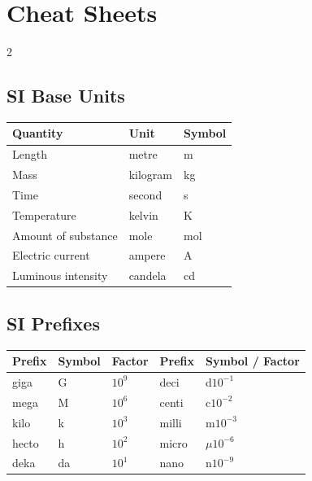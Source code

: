 \section{Cheat Sheets}
\begin{multicols}{2}
\footnotesize
\setlength{\tabcolsep}{3pt}
\renewcommand{\arraystretch}{1.1}

\subsection*{SI Base Units}
\begin{tabular}{@{}p{3.4cm}p{2.2cm}p{1.4cm}@{}}
\toprule
Quantity & Unit & Symbol\\ \midrule
Length & metre & m\\
Mass & kilogram & kg\\
Time & second & s\\
Temperature & kelvin & K\\
Amount of substance & mole & mol\\
Electric current & ampere & A\\
Luminous intensity & candela & cd\\ \bottomrule
\end{tabular}

\subsection*{SI Prefixes}
\begin{tabular}{@{}p{1.6cm}p{1.2cm}p{1.6cm}p{1.6cm}p{1.2cm}@{}}
\toprule
Prefix & Symbol & Factor & Prefix & Symbol / Factor\\ \midrule
giga & G & $10^{9}$ & deci & d\enspace$10^{-1}$\\
mega & M & $10^{6}$ & centi & c\enspace$10^{-2}$\\
kilo & k & $10^{3}$ & milli & m\enspace$10^{-3}$\\
hecto & h & $10^{2}$ & micro & $\mu$\enspace$10^{-6}$\\
deka & da & $10^{1}$ & nano & n\enspace$10^{-9}$\\ \bottomrule
\end{tabular}


\end{multicols}
